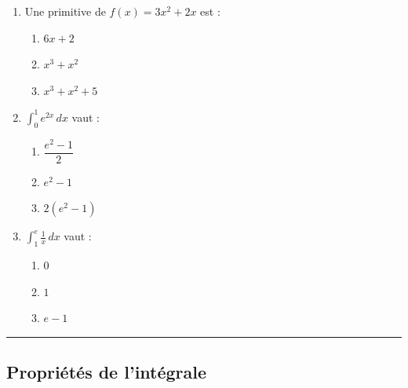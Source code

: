 \documentclass[../PolyS2.tex]{subfiles}
\begin{document}
\begin{enumerate}
\item Une primitive de $f(x) = 3x^2 + 2x$ est :
\begin{multicols}{3}
\begin{enumerate}[label=\alph*.]
\item $6x + 2$
\item $x^3 + x^2$
\item $x^3 + x^2 + 5$
\end{enumerate}
\end{multicols}

\item $\displaystyle\int_0^1 e^{2x} \, dx$ vaut :
\begin{multicols}{3}
\begin{enumerate}[label=\alph*.]
\item $\dfrac{e^2 - 1}{2}$
\item $e^2 - 1$
\item $2(e^2 - 1)$
\end{enumerate}
\end{multicols}

\newpage 

\item $\displaystyle\int_1^e \frac{1}{x} \, dx$ vaut :
\begin{multicols}{3}
\begin{enumerate}[label=\alph*.]
\item $0$
\item $1$
\item $e - 1$
\end{enumerate}
\end{multicols}
\end{enumerate}

\vspace{1em}\hrule\vspace{1em}

\subsection{Propriétés de l'intégrale}
\end{document}
